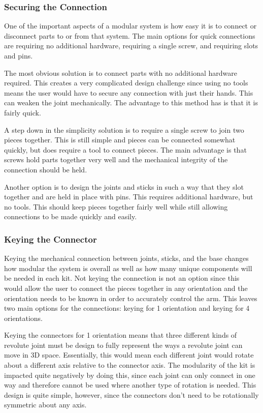 \subsubsection{Securing the Connection}
One of the important aspects of a modular system is how easy it is to connect or disconnect parts to or from that system. The main options for quick connections are requiring no additional hardware, requiring a single screw, and requiring slots and pins. 

\noindent The most obvious solution is to connect parts with no additional hardware required. This creates a very complicated design challenge since using no tools means the user would have to secure any connection with just their hands. This can weaken the joint mechanically. The advantage to this method has is that it is fairly quick. 

\noindent A step down in the simplicity solution is to require a single screw to join two pieces together. This is still simple and pieces can be connected somewhat quickly, but does require a tool to connect pieces. The main advantage is that screws hold parts together very well and the mechanical integrity of the connection should be held. 

\noindent Another option is to design the joints and sticks in such a way that they slot together and are held in place with pins. This requires additional hardware, but no tools. This should keep pieces together fairly well while still allowing connections to be made quickly and easily. 


\subsubsection{Keying the Connector}
Keying the mechanical connection between joints, sticks, and the base changes how modular the system is overall as well as how many unique components will be needed in each kit. Not keying the connection is not an option since this would allow the user to connect the pieces together in any orientation and the orientation needs to be known in order to accurately control the arm. This leaves two main options for the connections: keying for 1 orientation and keying for 4 orientations.

\noindent Keying the connectors for 1 orientation means that three different kinds of revolute joint must be design to fully represent the ways a revolute joint can move in 3D space. Essentially, this would mean each different joint would rotate about a different axis relative to the connector axis. The modularity of the kit is impacted quite negatively by doing this, since each joint can only connect in one way and therefore cannot be used where another type of rotation is needed. This design is quite simple, however, since the connectors don't need to be rotationally symmetric about any axis. 

